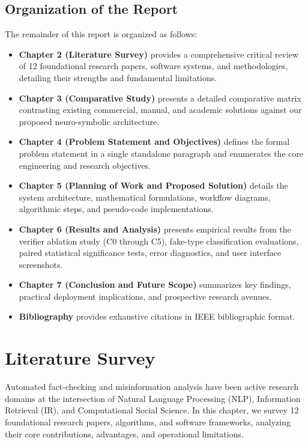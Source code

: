 \documentclass[12pt,a4paper]{report}
\begin{document}
\section{Organization of the Report}
The remainder of this report is organized as follows:
\begin{itemize}
    \item \textbf{Chapter 2 (Literature Survey)} provides a comprehensive critical review of 12 foundational research papers, software systems, and methodologies, detailing their strengths and fundamental limitations.
    \item \textbf{Chapter 3 (Comparative Study)} presents a detailed comparative matrix contrasting existing commercial, manual, and academic solutions against our proposed neuro-symbolic architecture.
    \item \textbf{Chapter 4 (Problem Statement and Objectives)} defines the formal problem statement in a single standalone paragraph and enumerates the core engineering and research objectives.
    \item \textbf{Chapter 5 (Planning of Work and Proposed Solution)} details the system architecture, mathematical formulations, workflow diagrams, algorithmic steps, and pseudo-code implementations.
    \item \textbf{Chapter 6 (Results and Analysis)} presents empirical results from the verifier ablation study (C0 through C5), fake-type classification evaluations, paired statistical significance tests, error diagnostics, and user interface screenshots.
    \item \textbf{Chapter 7 (Conclusion and Future Scope)} summarizes key findings, practical deployment implications, and prospective research avenues.
    \item \textbf{Bibliography} provides exhaustive citations in IEEE bibliographic format.
\end{itemize}

\chapter{Literature Survey}

Automated fact-checking and misinformation analysis have been active research domains at the intersection of Natural Language Processing (NLP), Information Retrieval (IR), and Computational Social Science. In this chapter, we survey 12 foundational research papers, algorithms, and software frameworks, analyzing their core contributions, advantages, and operational limitations.
\end{document}
